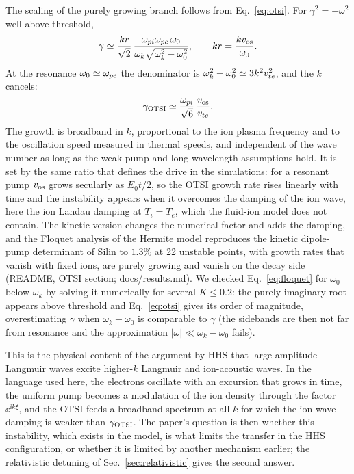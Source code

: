 The scaling of the purely growing branch follows from Eq.~\eqref{eq:otsi}. For $\gamma^2=-\omega^2$ well above threshold,
\begin{equation}
\gamma\simeq\frac{kr}{\sqrt2}\,\frac{\omega_{pi}\omega_{pe}\,\omega_0}{\omega_k\sqrt{\omega_k^2-\omega_0^2}} ,\qquad kr=\frac{kv_{\rm os}}{\omega_0}.
\end{equation}
At the resonance $\omega_0\simeq\omega_{pe}$ the denominator is $\omega_k^2-\omega_0^2\simeq3k^2v_{te}^2$, and the $k$ cancels:
\begin{equation}
\gamma_{\rm OTSI}\simeq\frac{\omega_{pi}}{\sqrt6}\,\frac{v_{\rm os}}{v_{te}}.\label{eq:gammaOTSI}
\end{equation}
The growth is broadband in $k$, proportional to the ion plasma frequency and to the oscillation speed measured in thermal speeds, and independent of the wave number as long as the weak-pump and long-wavelength assumptions hold. It is set by the same ratio that defines the drive in the simulations: for a resonant pump $v_{\rm os}$ grows secularly as $E_0t/2$, so the OTSI growth rate rises linearly with time and the instability appears when it overcomes the damping of the ion wave, here the ion Landau damping at $T_i=T_e$, which the fluid-ion model does not contain. The kinetic version changes the numerical factor and adds the damping, and the Floquet analysis of the Hermite model reproduces the kinetic dipole-pump determinant of Silin to $1.3\%$ at 22 unstable points, with growth rates that vanish with fixed ions, are purely growing and vanish on the decay side (README, OTSI section; docs/results.md). We checked Eq.~\eqref{eq:floquet} for $\omega_0$ below $\omega_k$ by solving it numerically for several $K\le0.2$: the purely imaginary root appears above threshold and Eq.~\eqref{eq:otsi} gives its order of magnitude, overestimating $\gamma$ when $\omega_k-\omega_0$ is comparable to $\gamma$ (the sidebands are then not far from resonance and the approximation $|\omega|\ll\omega_k-\omega_0$ fails).

This is the physical content of the argument by HHS that large-amplitude Langmuir waves excite higher-$k$ Langmuir and ion-acoustic waves. In the language used here, the electrons oscillate with an excursion that grows in time, the uniform pump becomes a modulation of the ion density through the factor $\ee^{\ii k\xi}$, and the OTSI feeds a broadband spectrum at all $k$ for which the ion-wave damping is weaker than $\gamma_{\rm OTSI}$. The paper's question is then whether this instability, which exists in the model, is what limits the transfer in the HHS configuration, or whether it is limited by another mechanism earlier; the relativistic detuning of Sec.~\ref{sec:relativistic} gives the second answer.

